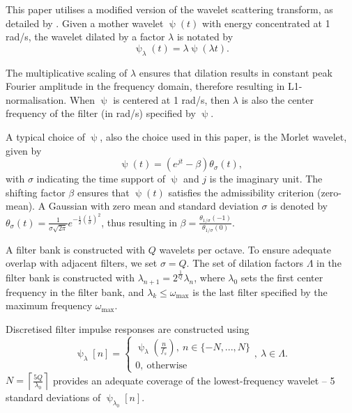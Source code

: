 {This paper utilises a modified version of the wavelet scattering transform, as detailed by \citet{ws}. Given a mother wavelet $\uppsi(t)$ with energy concentrated at 1 rad/s, the wavelet dilated by a factor $\lambda$ is notated by
\begin{equation}
\label{eqn:waveletscaling}
    \uppsi_\lambda(t) = \lambda \uppsi(\lambda t).
\end{equation}

The multiplicative scaling of $\lambda$ ensures that dilation results in constant peak Fourier amplitude in the frequency domain, therefore resulting in L1-normalisation. When $\uppsi$ is centered at 1 rad/s, then $\lambda$ is also the center frequency of the filter (in rad/s) specified by $\uppsi$.

 A typical choice of $\uppsi$, also the choice used in this paper, is the Morlet wavelet, given by
\begin{equation}
\label{eqn:morlet}
    \uppsi(t) = (e^{jt} - \beta) \theta_\sigma(t),
\end{equation}
with $\sigma$ indicating the time support of $\uppsi$ and $j$ is the imaginary unit. The shifting factor $\beta$ ensures that $\uppsi(t)$ satisfies the admissibility criterion (zero-mean). A Gaussian with zero mean and standard deviation $\sigma$ is denoted by $\theta_\sigma(t) = \frac{1}{\sigma\sqrt{2 \pi}} e^{-\frac{1}{2}\left(\frac{t}{\sigma}\right)^2}$, thus resulting in $\beta = \frac{\theta_{1/\sigma}(-1)}{\theta_{1/\sigma}(0)}$.

A filter bank is constructed with $Q$ wavelets per octave. To ensure adequate overlap with adjacent filters, we set $\sigma = Q$. The set of dilation factors $\Lambda$ in the filter bank is constructed with $\lambda_{n+1} = 2^{\frac{1}{Q}} \lambda_n$, where $\lambda_0$ sets the first center frequency in the filter bank, and $\lambda_k \le \omega_\text{max}$ is the last filter specified by the maximum frequency $\omega_\text{max}$.

Discretised filter impulse responses are constructed using
\begin{equation}
    \uppsi_\lambda[n] = \begin{cases}
        \uppsi_\lambda\left(\frac{n}{f_s}\right), \ n \in \{-N, ..., N\} \\
        0, \ \text{otherwise}
    \end{cases} , \ \lambda \in \Lambda.
\end{equation}
$N = \left\lceil\frac{5 Q}{\lambda_0} \right\rceil$ provides an adequate coverage of the lowest-frequency wavelet -- 5 standard deviations of  $\uppsi_{\lambda_0}[n]$.

}
